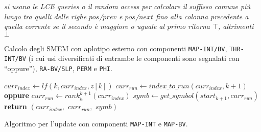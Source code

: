 \begin{algorithm}
\begin{algorithmic}[1]
    
    \State \textit{si usano le LCE queries o il random access per calcolare il
    suffisso comune più lungo tra quelli delle righe}
    \State \textit{$pos$/$prev$ e
    $pos$/$next$ fino alla colonna precedente a quella corrente} 
    \State \textit{se il secondo è maggiore o uguale al primo ritorna $\top$,
    altrimenti $\bot$} 
    \EndFunction
  \end{algorithmic}
  \caption{\footnotesize{Calcolo degli SMEM con aplotipo esterno con componenti
  \texttt{MAP-INT/BV},
  \texttt{THR-INT/BV} (i cui usi diversificati di entrambe le componenti sono
  segnalati con ``oppure''), \texttt{RA-BV/SLP}, \texttt{PERM} e \texttt{PHI}.}}    
  \label{algo:matchthr}
\end{algorithm}
\begin{algorithm}
  \footnotesize
  \begin{algorithmic}[1]
    \State $curr_{index}\gets lf(k, curr_{index}, z[k])$
    \State $curr_{run}\gets index\_to\_run(curr_{index},k+1)$ \textbf{oppure}
    $curr_{run}\gets rank_h^{k+1}(curr_{index})$
    \State $symb\gets get\_symbol(start_{k+1}, curr_{run})$
    \State \textbf{return} $(curr_{index},\,\,curr_{run},\,\,symb)$
    \EndFunction
  \end{algorithmic}
  \caption{Algoritmo per l'update con componenti \texttt{MAP-INT} e
  \texttt{MAP-BV}.} 
  \label{algo:updatems}
\end{algorithm}
